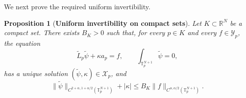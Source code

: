 \documentclass[preprint]{elsarticle}
\newtheorem{proposition}{Proposition}[section]
\numberwithin{equation}{section}
\begin{document}
We next prove the required uniform invertibility.
\begin{proposition}[\textbf{Uniform invertibility on compact sets}]
Let $K\subset\mathbb R^N$ be a compact set. There exists $B_K>0$ such that, for every $p\in K$ and every $f\in\mathcal Y_p$, the equation
\begin{equation*}
\widetilde L_p\widetilde\psi+\kappa a_p=f,
\qquad
\int_{\mathbb T_p^{N+1}}\widetilde\psi=0,
\end{equation*}
has a unique solution $(\widetilde\psi,\kappa)\in\mathcal X_p$, and
\begin{equation*}
\|\widetilde\psi\|_{C^{2+\alpha,1+\alpha/2}(\mathbb T_p^{N+1})}
+
|\kappa|
\le
B_K\|f\|_{C^{\alpha,\alpha/2}(\mathbb T_p^{N+1})}.
\end{equation*}
\end{proposition}
\end{document}
